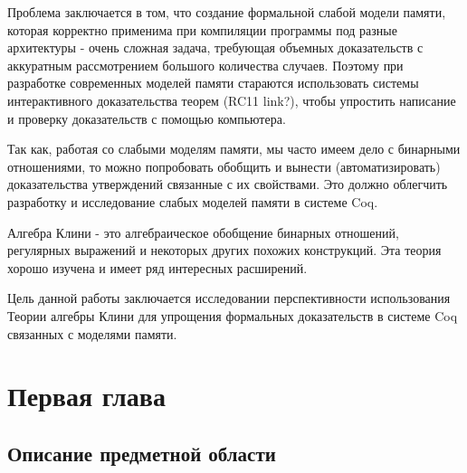 \documentclass[times
              ]{itmo-student-thesis}
\begin{document}
Проблема заключается в том, что создание формальной слабой модели памяти, которая корректно применима при компиляции программы под разные архитектуры - очень сложная задача, требующая объемных доказательств с аккуратным рассмотрением большого количества случаев.
Поэтому при разработке современных моделей памяти стараются использовать системы интерактивного доказательства теорем (RC11 link?), чтобы упростить написание и проверку доказательств с помощью компьютера.

Так как, работая со слабыми моделям памяти, мы часто имеем дело с бинарными отношениями, то можно попробовать обобщить и вынести (автоматизировать) доказательства утверждений связанные с их свойствами.
Это должно облегчить разработку и исследование слабых моделей памяти в системе Coq.

Алгебра Клини - это алгебраическое обобщение бинарных отношений, регулярных выражений и некоторых других похожих конструкций.
Эта теория хорошо изучена и имеет ряд интересных расширений.

Цель данной работы заключается исследовании перспективности использования Теории алгебры Клини для упрощения формальных доказательств в системе Coq связанных с моделями памяти.


\chapter{Первая глава}
  \section{Описание предметной области}

\end{document}
